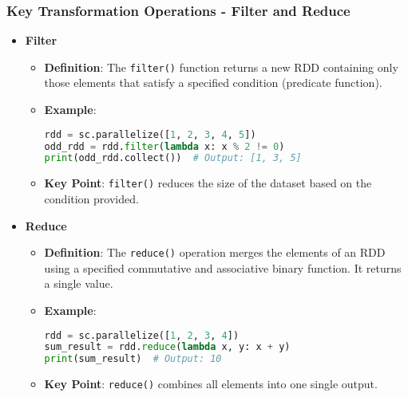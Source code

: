 \documentclass{beamer}
\begin{document}
\begin{frame}[fragile]
    \frametitle{Key Transformation Operations - Filter and Reduce}
    \begin{itemize}
        \item \textbf{Filter}
            \begin{itemize}
                \item \textbf{Definition}: The \texttt{filter()} function returns a new RDD containing only those elements that satisfy a specified condition (predicate function).
                \item \textbf{Example}:
                    \begin{lstlisting}[language=Python]
rdd = sc.parallelize([1, 2, 3, 4, 5])
odd_rdd = rdd.filter(lambda x: x % 2 != 0)
print(odd_rdd.collect())  # Output: [1, 3, 5]
                    \end{lstlisting}
                \item \textbf{Key Point}: \texttt{filter()} reduces the size of the dataset based on the condition provided.
            \end{itemize}

        \item \textbf{Reduce}
            \begin{itemize}
                \item \textbf{Definition}: The \texttt{reduce()} operation merges the elements of an RDD using a specified commutative and associative binary function. It returns a single value.
                \item \textbf{Example}:
                    \begin{lstlisting}[language=Python]
rdd = sc.parallelize([1, 2, 3, 4])
sum_result = rdd.reduce(lambda x, y: x + y)
print(sum_result)  # Output: 10
                    \end{lstlisting}
                \item \textbf{Key Point}: \texttt{reduce()} combines all elements into one single output.
            \end{itemize}
    \end{itemize}
\end{frame}
\end{document}
